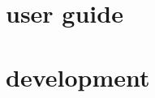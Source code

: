 \documentclass[oneside]{scrbook}
\begin{document}
\maketitle
\begin{multicols}{2}
\tableofcontents
\end{multicols}


\chapter{user guide}


\chapter{development}

\end{document}
